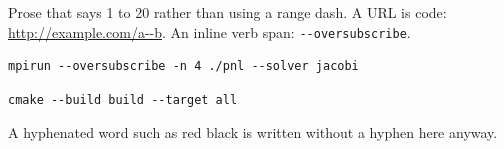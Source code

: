 \documentclass{article}
\begin{document}
Prose that says 1 to 20 rather than using a range dash.
A URL is code: \url{http://example.com/a--b}.
An inline verb span: \verb|--oversubscribe|.
\begin{verbatim}
mpirun --oversubscribe -n 4 ./pnl --solver jacobi
\end{verbatim}
\begin{lstlisting}
cmake --build build --target all
\end{lstlisting}
A hyphenated word such as red black is written without a hyphen here anyway.
\end{document}
